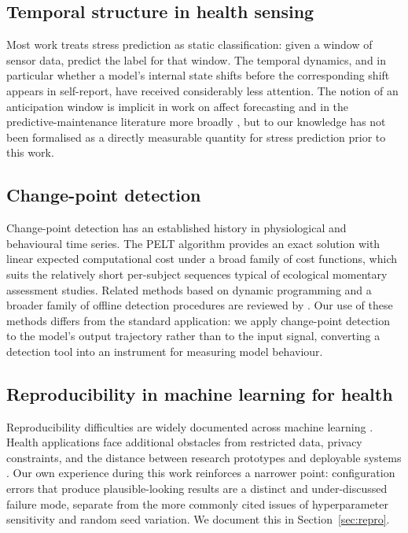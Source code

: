 \documentclass[preprint,12pt,authoryear]{elsarticle}
\begin{document}
\subsection{Temporal structure in health sensing}

Most work treats stress prediction as static classification: given a
window of sensor data, predict the label for that window. The temporal
dynamics, and in particular whether a model's internal state shifts
before the corresponding shift appears in self-report, have received
considerably less attention. The notion of an anticipation window is
implicit in work on affect forecasting and in the predictive-maintenance
literature more broadly \citep{lei2018}, but to our knowledge has not
been formalised as a directly measurable quantity for stress prediction
prior to this work.

\subsection{Change-point detection}

Change-point detection has an established history in physiological and
behavioural time series. The PELT algorithm \citep{killick2012} provides
an exact solution with linear expected computational cost under a broad
family of cost functions, which suits the relatively short per-subject
sequences typical of ecological momentary assessment studies. Related
methods based on dynamic programming \citep{jackson2005} and a broader
family of offline detection procedures are reviewed by
\citet{truong2020}. Our use of these methods differs from the standard
application: we apply change-point detection to the model's output
trajectory rather than to the input signal, converting a detection tool
into an instrument for measuring model behaviour.

\subsection{Reproducibility in machine learning for health}

Reproducibility difficulties are widely documented across machine
learning \citep{pineau2021}. Health applications face additional
obstacles from restricted data, privacy constraints, and the distance
between research prototypes and deployable systems
\citep{beam2018,futoma2020}. Our own experience during this work
reinforces a narrower point: configuration errors that produce
plausible-looking results are a distinct and under-discussed failure
mode, separate from the more commonly cited issues of hyperparameter
sensitivity and random seed variation. We document this in
Section~\ref{sec:repro}.
\end{document}
